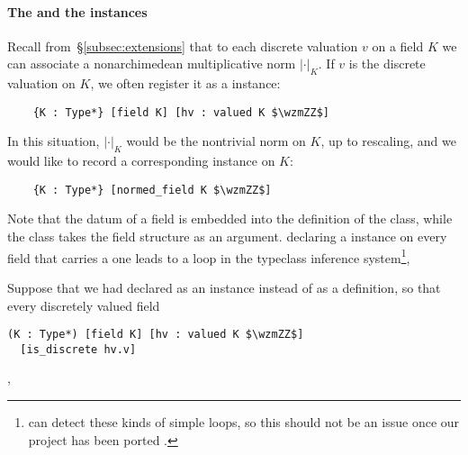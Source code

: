 \documentclass[sigplan,10pt, nonacm, review]{acmart}
\begin{document}
\paragraph{The  and the  instances}
Recall from~\S\ref{subsec:extensions} that to each discrete valuation $v$ on a field $K$ we can associate a nonarchimedean multiplicative norm $\lvert\cdot\rvert_K$. If $v$ is the  discrete valuation on $K$, we often register it as a  instance:
\begin{lstlisting}
    {K : Type*} [field K] [hv : valued K $\wzmZZ$] 
\end{lstlisting}
In this situation, $\lvert\cdot\rvert_K$ would be the  nontrivial norm on $K$, up to rescaling, and we would like to record a corresponding  instance on $K$:
\begin{lstlisting}
    {K : Type*} [normed_field K $\wzmZZ$] 
\end{lstlisting}
Note that the datum of a field is embedded into the definition of the  class, while the class  takes the field structure as an argument.  declaring a  instance on every field that carries a  one leads to a loop in the typeclass inference system\footnote{\lean[4] can detect these kinds of simple loops, so this should not be an issue once our project has been ported .}, 

Suppose that we had declared  as an instance instead of as a definition, so that every discretely valued field
\begin{lstlisting}
(K : Type*) [field K] [hv : valued K $\wzmZZ$]
  [is_discrete hv.v]
\end{lstlisting}
  

  , 
\end{document}
